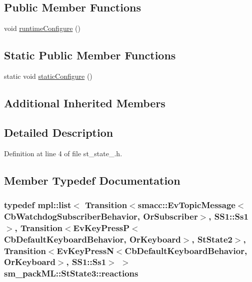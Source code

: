 \subsection*{Public Member Functions}
\begin{DoxyCompactItemize}
\item 
void \hyperlink{structsm__packML_1_1StState3_a0c0fce30cd0db2611ac4b05a6a0d008e}{runtime\+Configure} ()
\end{DoxyCompactItemize}
\subsection*{Static Public Member Functions}
\begin{DoxyCompactItemize}
\item 
static void \hyperlink{structsm__packML_1_1StState3_a2b47dd305953d256a159c62afc6061b7}{static\+Configure} ()
\end{DoxyCompactItemize}
\subsection*{Additional Inherited Members}


\subsection{Detailed Description}


Definition at line 4 of file st\+\_\+state\+\_.\+h.



\subsection{Member Typedef Documentation}
\subsubsection[{\texorpdfstring{reactions}{reactions}}]{\setlength{\rightskip}{0pt plus 5cm}typedef mpl\+::list$<$ Transition$<${\bf smacc\+::\+Ev\+Topic\+Message}$<${\bf Cb\+Watchdog\+Subscriber\+Behavior}, {\bf Or\+Subscriber}$>$, {\bf S\+S1\+::\+Ss1}$>$, Transition$<$Ev\+Key\+PressP$<$Cb\+Default\+Keyboard\+Behavior, {\bf Or\+Keyboard}$>$, {\bf St\+State2}$>$, Transition$<$Ev\+Key\+PressN$<$Cb\+Default\+Keyboard\+Behavior, {\bf Or\+Keyboard}$>$, {\bf S\+S1\+::\+Ss1}$>$ $>$ {\bf sm\+\_\+pack\+M\+L\+::\+St\+State3\+::reactions}}\hypertarget{structsm__packML_1_1StState3_af4c5429b333954877ff64c5db6558912}{}\label{structsm__packML_1_1StState3_af4c5429b333954877ff64c5db6558912}


